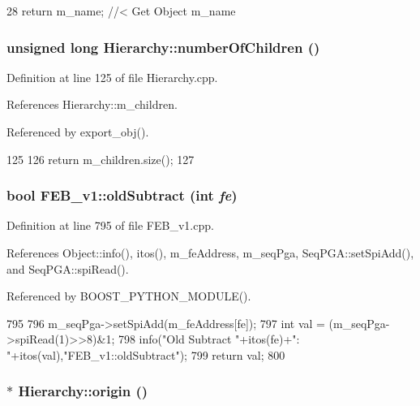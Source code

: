 \begin{DoxyCode}
28 { return m_name; } //< Get Object m_name
\end{DoxyCode}
\hypertarget{classHierarchy_ab16e84de65fd84e14001a6cf941c8be4}{
\subsubsection[{numberOfChildren}]{\setlength{\rightskip}{0pt plus 5cm}unsigned long Hierarchy::numberOfChildren ()}}
\label{classHierarchy_ab16e84de65fd84e14001a6cf941c8be4}


Definition at line 125 of file Hierarchy.cpp.

References Hierarchy::m\_\-children.

Referenced by export\_\-obj().


\begin{DoxyCode}
125                                            {
126   return m_children.size();
127 }
\end{DoxyCode}
\hypertarget{classFEB__v1_a5b277ace76b9e511c055ad94d241dd61}{
\subsubsection[{oldSubtract}]{\setlength{\rightskip}{0pt plus 5cm}bool FEB\_\-v1::oldSubtract (int {\em fe})}}
\label{classFEB__v1_a5b277ace76b9e511c055ad94d241dd61}


Definition at line 795 of file FEB\_\-v1.cpp.

References Object::info(), itos(), m\_\-feAddress, m\_\-seqPga, SeqPGA::setSpiAdd(), and SeqPGA::spiRead().

Referenced by BOOST\_\-PYTHON\_\-MODULE().


\begin{DoxyCode}
795                                 {
796   m_seqPga->setSpiAdd(m_feAddress[fe]);
797   int val = (m_seqPga->spiRead(1)>>8)&1;
798   info("Old Subtract "+itos(fe)+": "+itos(val),"FEB_v1::oldSubtract");
799   return val;
800 }
\end{DoxyCode}
\hypertarget{classHierarchy_aee461dc930ce3871636ff87f075b1b83}{
\subsubsection[{origin}]{$\ast$ Hierarchy::origin ()}}
\label{classHierarchy_aee461dc930ce3871636ff87f075b1b83}


